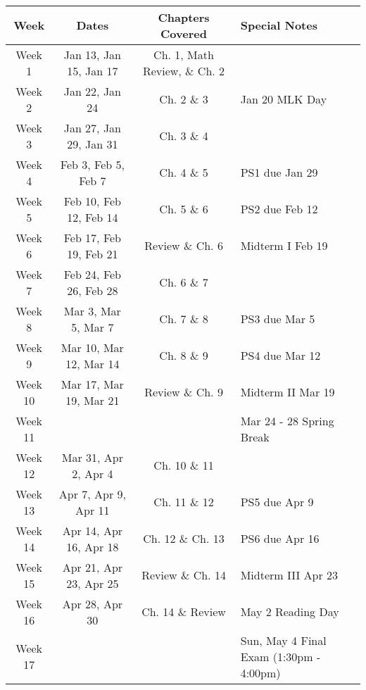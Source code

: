 \documentclass[11pt]{article}
\begin{document}
\newpage
{}\\

\begin{tabularx}{\textwidth}{|c|c|c|X|}
    \hline
    \textbf{Week} & \textbf{Dates} & \textbf{Chapters Covered} & \textbf{Special Notes} \\
    \hline
    Week 1 & Jan 13, Jan 15, Jan 17 & Ch. 1, Math Review, \& Ch. 2 & \\
    \hline
    Week 2 & Jan 22, Jan 24 & Ch. 2 \& 3 & Jan 20 MLK Day\\
    \hline
    Week 3 & Jan 27, Jan 29, Jan 31 & Ch. 3 \& 4 & \\
    \hline
    Week 4 & Feb 3, Feb 5, Feb 7 & Ch. 4 \& 5 & PS1 due Jan 29 \\
    \hline
	Week 5 & Feb 10, Feb 12, Feb 14 & Ch. 5 \& 6 & PS2 due Feb 12\\
    \hline
    Week 6 & Feb 17, Feb 19, Feb 21 & Review \& Ch. 6 & Midterm I Feb 19 \\
    \hline
    Week 7 & Feb 24, Feb 26, Feb 28 & Ch. 6 \& 7 & \\
    \hline
    Week 8 & Mar 3, Mar 5, Mar 7 & Ch. 7 \& 8 & PS3 due Mar 5 \\
    \hline
	Week 9 & Mar 10, Mar 12, Mar 14 & Ch. 8 \& 9 & PS4 due Mar 12 \\
    \hline
	Week 10 & Mar 17, Mar 19, Mar 21 & Review \& Ch. 9 & Midterm II Mar 19\\
    \hline
	Week 11 & & & Mar 24 - 28 Spring Break\\
    \hline
	Week 12 & Mar 31, Apr 2, Apr 4 & Ch. 10 \& 11 & \\
    \hline
	Week 13 & Apr 7, Apr 9, Apr 11 & Ch. 11 \& 12 & PS5 due Apr 9 \\
    \hline
	Week 14 & Apr 14, Apr 16, Apr 18 & Ch. 12 \& Ch. 13 & PS6 due Apr 16 \\
    \hline
	Week 15 & Apr 21, Apr 23, Apr 25 & Review \& Ch. 14 & Midterm III Apr 23\\
    \hline
	Week 16 & Apr 28, Apr 30 & Ch. 14 \& Review & May 2 Reading Day\\
    \hline
	Week 17 & & & Sun, May 4 Final Exam (1:30pm - 4:00pm)\\
    \hline
\end{tabularx}

\newpage
\medskip{}\\
\end{document}
